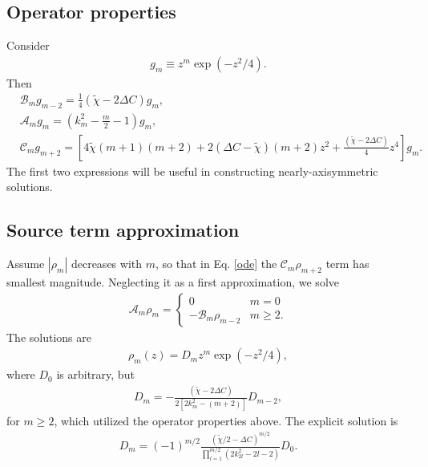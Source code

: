 \documentclass[12pt]{article} %
\begin{document}
\subsection{Operator properties}
Consider
\begin{align}
	g_m \equiv z^m\exp{(-z^2/4)}.
\end{align}
Then
\begin{align}
&\mathcal{B}_mg_{m-2} =\frac{1}{4}\left(\tilde{\chi} - 2\Delta C\right)g_m,\\
&\mathcal{A}_mg_m = \left(k_m^2 - \frac{m}{2} - 1\right)g_m,\\
&\mathcal{C}_mg_{m+2} = \left[4\tilde{\chi}(m+1)(m+2) +2(\Delta C-\tilde{\chi})(m+2)z^2 + \frac{\left(\tilde{\chi} - 2\Delta C\right)}{4}z^4\right]g_m. 
\end{align}
The first two expressions will be useful in constructing nearly-axisymmetric solutions. 

\subsection{Source term approximation}
Assume $|\rho_m|$ decreases with $m$, so that in Eq. \ref{ode} the $\mathcal{C}_m\rho_{m+2}$ term has smallest magnitude.  Neglecting it as a first approximation, we solve
\begin{align}
\mathcal{A}_m\rho_m = \begin{cases}
        0 & m =0 \\
	-\mathcal{B}_m\rho_{m-2} & m \geq 2.
\end{cases}
\end{align}
The solutions are 
\begin{align}
\rho_m (z)= D_m z^m\exp{(-z^2/4)},
\end{align}
where $D_0$ is arbitrary, but
\begin{align}
D_m  = -\frac{\left(\tilde{\chi} - 2\Delta C\right)}{2\left[2k_m^2 - (m+2)\right]}D_{m-2},
\end{align}
for $m\geq2$, which utilized the operator properties above. The explicit solution is
\begin{align}
D_m  = \left(-1\right)^{m/2}\frac{\left(\tilde{\chi}/2-\Delta C\right)^{m/2}}{\prod_{l=1}^{m/2}
\left(2k_{2l}^2 -2l - 2\right)}D_0.
\end{align}
\end{document}
